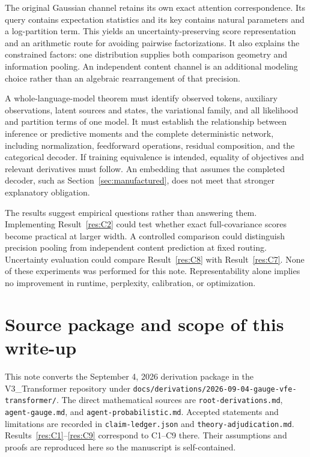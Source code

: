 \documentclass[11pt]{article}
\begin{document}
The original Gaussian channel retains its own exact attention correspondence. Its query contains expectation statistics and its key contains natural parameters and a log-partition term. This yields an uncertainty-preserving score representation and an arithmetic route for avoiding pairwise factorizations. It also explains the constrained factors: one distribution supplies both comparison geometry and information pooling. An independent content channel is an additional modeling choice rather than an algebraic rearrangement of that precision.

A whole-language-model theorem must identify observed tokens, auxiliary observations, latent sources and states, the variational family, and all likelihood and partition terms of one model. It must establish the relationship between inference or predictive moments and the complete deterministic network, including normalization, feedforward operations, residual composition, and the categorical decoder. If training equivalence is intended, equality of objectives and relevant derivatives must follow. An embedding that assumes the completed decoder, such as Section~\ref{sec:manufactured}, does not meet that stronger explanatory obligation.

The results suggest empirical questions rather than answering them. Implementing Result~\ref{res:C2} could test whether exact full-covariance scores become practical at larger width. A controlled comparison could distinguish precision pooling from independent content prediction at fixed routing. Uncertainty evaluation could compare Result~\ref{res:C8} with Result~\ref{res:C7}. None of these experiments was performed for this note. Representability alone implies no improvement in runtime, perplexity, calibration, or optimization.

\appendix
\section{Source package and scope of this write-up}
\label{app:provenance}
This note converts the September 4, 2026 derivation package in the V3\_Transformer repository under \texttt{docs/derivations/2026-09-04-gauge-vfe-transformer/}. The direct mathematical sources are \texttt{root-derivations.md}, \texttt{agent-gauge.md}, and \texttt{agent-probabilistic.md}. Accepted statements and limitations are recorded in \texttt{claim-ledger.json} and \texttt{theory-adjudication.md}. Results~\ref{res:C1}--\ref{res:C9} correspond to C1--C9 there. Their assumptions and proofs are reproduced here so the manuscript is self-contained.
\end{document}
